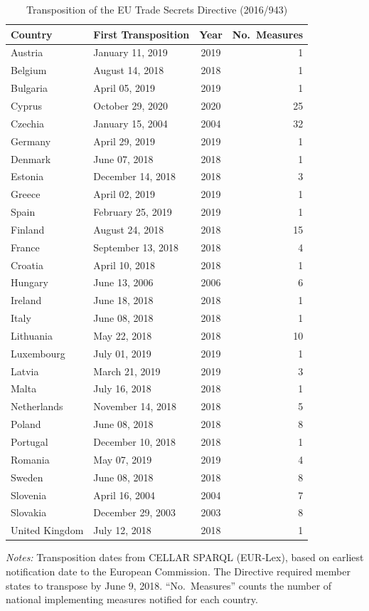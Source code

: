 \begin{table}[htbp]
\centering
\caption{Transposition of the EU Trade Secrets Directive (2016/943)}
\label{tab:transposition}
\begin{tabular}{llcr}
\hline\hline
Country & First Transposition & Year & No.\ Measures \\
\hline
Austria & January 11, 2019 & 2019 & 1 \\
Belgium & August 14, 2018 & 2018 & 1 \\
Bulgaria & April 05, 2019 & 2019 & 1 \\
Cyprus & October 29, 2020 & 2020 & 25 \\
Czechia & January 15, 2004 & 2004 & 32 \\
Germany & April 29, 2019 & 2019 & 1 \\
Denmark & June 07, 2018 & 2018 & 1 \\
Estonia & December 14, 2018 & 2018 & 3 \\
Greece & April 02, 2019 & 2019 & 1 \\
Spain & February 25, 2019 & 2019 & 1 \\
Finland & August 24, 2018 & 2018 & 15 \\
France & September 13, 2018 & 2018 & 4 \\
Croatia & April 10, 2018 & 2018 & 1 \\
Hungary & June 13, 2006 & 2006 & 6 \\
Ireland & June 18, 2018 & 2018 & 1 \\
Italy & June 08, 2018 & 2018 & 1 \\
Lithuania & May 22, 2018 & 2018 & 10 \\
Luxembourg & July 01, 2019 & 2019 & 1 \\
Latvia & March 21, 2019 & 2019 & 3 \\
Malta & July 16, 2018 & 2018 & 1 \\
Netherlands & November 14, 2018 & 2018 & 5 \\
Poland & June 08, 2018 & 2018 & 8 \\
Portugal & December 10, 2018 & 2018 & 1 \\
Romania & May 07, 2019 & 2019 & 4 \\
Sweden & June 08, 2018 & 2018 & 8 \\
Slovenia & April 16, 2004 & 2004 & 7 \\
Slovakia & December 29, 2003 & 2003 & 8 \\
United Kingdom & July 12, 2018 & 2018 & 1 \\
\hline\hline
\end{tabular}
\begin{tablenotes}[flushleft]
\small
\item \textit{Notes:} Transposition dates from CELLAR SPARQL (EUR-Lex), based on earliest notification date to the European Commission. The Directive required member states to transpose by June 9, 2018. ``No.\ Measures'' counts the number of national implementing measures notified for each country.
\end{tablenotes}
\end{table}

